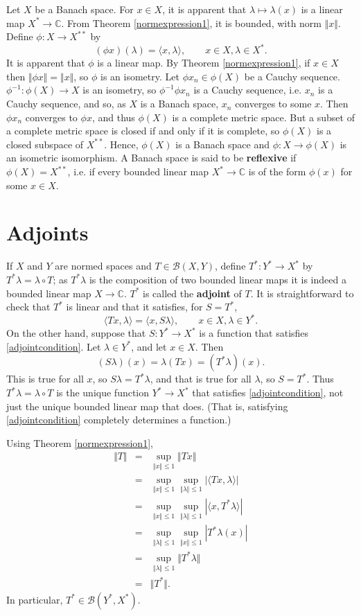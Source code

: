 \documentclass{article}
\newcommand{\inner}[2]{\langle #1, #2 \rangle}
\newcommand{\norm}[1]{\Vert #1 \Vert}
\theoremstyle{definition}
\begin{document}
Let $X$ be a Banach space.
For $x \in X$, it is apparent that $\lambda \mapsto \lambda(x)$ is a linear
map $X^* \to \mathbb{C}$. From Theorem \ref{normexpression1}, it is bounded, with norm $\norm{x}$.
Define $\phi:X \to X^{**}$ by
\[
(\phi x)(\lambda)=\inner{x}{\lambda}, \qquad x \in X, \lambda \in X^*.
\]
It is apparent that $\phi$ is a linear map. By Theorem \ref{normexpression1}, if $x \in X$ then $\norm{\phi x}=\norm{x}$, so
$\phi$ is an isometry. 
Let $\phi x_n \in \phi(X)$ be a Cauchy sequence. $\phi^{-1}:\phi(X) \to X$ is an isometry, so
$\phi^{-1} \phi x_n$ is a Cauchy sequence, i.e. $x_n$ is a Cauchy sequence, and so, as $X$ is a Banach space, $x_n$ converges to some $x$. Then
$\phi x_n$ converges to $\phi x$, and thus $\phi(X)$ is a complete metric space. But a subset of a complete metric space is closed if and only if it is complete, so
$\phi(X)$ is a closed subspace of $X^{**}$. Hence, $\phi(X)$ is a Banach space and $\phi:X \to \phi(X)$ is an isometric isomorphism.
A Banach space is said to be \textbf{reflexive} if $\phi(X) = X^{**}$, i.e. if every bounded linear map $X^* \to \mathbb{C}$ is of the form $\phi(x)$ for some $x \in X$.



\section{Adjoints}
If $X$ and $Y$ are normed spaces and $T \in \mathscr{B}(X,Y)$, 
define $T^*:Y^* \to X^*$ by $T^* \lambda=\lambda \circ T$; as $T^*\lambda$ is the composition of two bounded linear
maps it is indeed a bounded linear map $X \to \mathbb{C}$. $T^*$ is called the \textbf{adjoint} of $T$.
It is straightforward to check that $T^*$ is linear and that it satisfies, for $S=T^*$,
\begin{equation}
\inner{Tx}{\lambda}=\inner{x}{S\lambda}, \qquad x \in X, \lambda \in Y^*.
\label{adjointcondition}
\end{equation}
On the other hand, suppose that $S:Y^* \to X^*$ is a function that satisfies \eqref{adjointcondition}. Let $\lambda \in Y^*$, and let
$x \in X$. Then
\[
(S\lambda)(x) = \lambda(Tx)= (T^*\lambda)(x).
\]
This is true for all $x$, so $S\lambda=T^*\lambda$, and that is true for all $\lambda$, so $S=T^*$. Thus $T^*\lambda=
\lambda \circ T$ is the unique function $Y^* \to X^*$ that satisfies \eqref{adjointcondition}, not just the unique bounded linear
map that does. (That is, satisfying \eqref{adjointcondition} completely determines a function.)

Using Theorem \ref{normexpression1}, 
\begin{eqnarray*}
\norm{T}&=&\sup_{\norm{x} \leq 1} \norm{Tx}\\
&=&\sup_{\norm{x} \leq 1} \sup_{\norm{\lambda} \leq 1} |\inner{Tx}{\lambda}|\\
&=&\sup_{\norm{x} \leq 1} \sup_{\norm{\lambda} \leq 1} |\inner{x}{T^*\lambda}|\\
&=&\sup_{\norm{\lambda} \leq 1} \sup_{\norm{x} \leq 1} |T^*\lambda(x)|\\
&=&\sup_{\norm{\lambda} \leq 1} \norm{T^*\lambda}\\
&=&\norm{T^*}.
\end{eqnarray*}
In particular, $T^* \in \mathscr{B}(Y^*,X^*)$.
\end{document}
